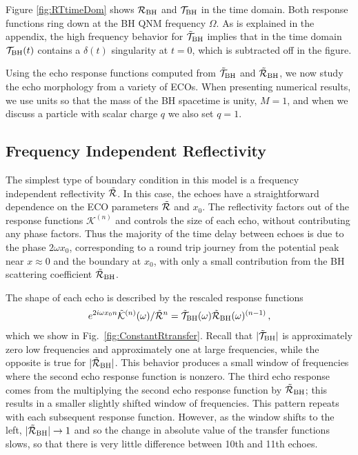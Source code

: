 \begin{refsection}
Figure \ref{fig:RTtimeDom} shows $\mathcal R_{\rm BH}$ and $\mathcal T_{\rm BH}$ in the time domain. Both response functions ring down at the BH QNM frequency $\Omega$. 
As is explained in the appendix, the high frequency behavior for $\tilde{\mathcal T}_{\rm BH}$ implies that in the time domain $\mathcal T_{\rm BH}(t)$ contains a $\delta(t)$ singularity at $t=0$, which is subtracted off in the figure.

Using the echo response functions computed from $\tilde{\mathcal T}_{\rm BH}$ and $\tilde{\mathcal R}_{\rm BH}$, we now study the echo morphology from a variety of ECOs.
When presenting numerical results, we use units so that the mass of the BH spacetime is unity, $M=1$, and when we discuss a particle with scalar charge $q$ we also set $q = 1$. 


\subsection{Frequency Independent Reflectivity}
\label{sec:FIechos}

The simplest type of boundary condition in this model is a frequency independent reflectivity $\tilde{\mathcal R}$.  In this case, the echoes have a straightforward dependence on the ECO parameters $\mathcal {\tilde{\mathcal R}}$ and $x_0$. 
The reflectivity factors out of the response functions $\mathcal K^{(n)}$ and controls the size of each echo, without contributing any phase factors. 
Thus the majority of the time delay between echoes is due to the phase $2\omega x_0$, corresponding to a round trip journey from the potential peak near $x\approx 0$ and the boundary at $x_0$, with only  a small contribution from the BH scattering coefficient $\tilde{\mathcal R}_{\rm BH}$. 

The shape of each echo is described by the rescaled response functions
\begin{align}
\label{eq:ShiftedEchoResponse}
e^{2i\omega x_0 n}\tilde{\mathcal K}^{(n)}(\omega)/\tilde{\mathcal R}^n = \tilde{\mathcal T}_{\rm BH} (\omega)\tilde{\mathcal R}_{\rm BH}(\omega) ^{(n-1)} \,,
\end{align}
which we show in Fig.~\ref{fig:ConstantRtransfer}.
Recall that $|\tilde{\mathcal T}_{\rm BH}|$ is approximately zero low frequencies and approximately one at large frequencies, while the opposite is true for $|\tilde{\mathcal R}_{\rm BH}|$.
This behavior produces a small window of frequencies where the second echo response function is nonzero. 
The third echo response comes from the multiplying the second echo response function by $\tilde{\mathcal R}_{\rm BH}$; this results in a smaller slightly shifted window of frequencies. This pattern repeats with each subsequent response function. However, as the window shifts to the left, $|\tilde{\mathcal R}_{\rm BH}|\to 1$ and so the change in absolute value of the transfer functions slows, so that there is very little difference between 10th and 11th echoes.


\end{refsection}
